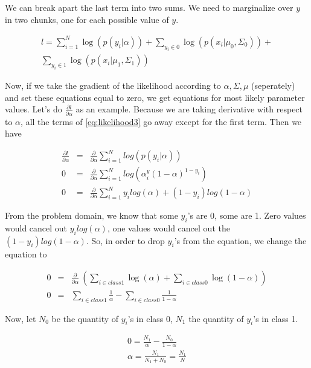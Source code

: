 \documentclass{ecctd01} %
\begin{document}
We can break apart the last term into two sums. We need to marginalize over $y$
in two chunks, one for each possible value of $y$.  

\begin{eqnarray}
  \label{eq:likelihood3}
  l = \sum_{i=1}^N \log(p(y_{i}|\alpha)) + 
  \sum_{y_{i}\in 0} \log(p(x_{i}|\mu_{0},\Sigma_{0})) + \nonumber \\
  \sum_{y_{i}\in 1} \log(p(x_{i}|\mu_{1},\Sigma_{1}))
\end{eqnarray}

Now, if we take the gradient of the likelihood according to $\alpha, \Sigma,
\mu$ (seperately) and set these equations equal to zero, we get equations for
most likely parameter values. Let's do $\frac{\partial l}{\partial
  \alpha}$ as an example. Because we are taking derivative with respect to
$\alpha$, all the terms of \eqref{eq:likelihood3} go away except for
the first term. Then we have

\begin{eqnarray}
  \label{eq:likelihood4}
  \frac{\partial l}{\partial \alpha} &=&
  \frac{\partial }{\partial \alpha}
  \sum_{i=1}^N log (p(y_{i}|\alpha))  \nonumber \\
  0 &=&
  \frac{\partial}{\partial \alpha}
  \sum_{i=1}^N log\left(\alpha^y_{i}(1-\alpha)^{1-y_{i}}\right) \nonumber \\
  0 &=&
  \frac{\partial}{\partial \alpha}
  \sum_{i=1}^N y_{i}log(\alpha) + (1-y_{i})log(1-\alpha) \nonumber
\end{eqnarray}

From the problem domain, we know that some $y_{i}$'s are 0, some are
1. Zero values would cancel out $y_{i}log(\alpha)$, one values would
cancel out the $(1-y_{i})log(1-\alpha)$. So, in order to drop
$y_{i}$'s from the equation, we change the equation to  

\begin{eqnarray}
  \label{eq:likelihood5}
  0 &=&
  \frac{\partial}{\partial \alpha}\
  \left(
  \sum_{i\in class1} \log(\alpha) +
  \sum_{i\in class0} \log(1-\alpha)
  \right)
  \nonumber \\
  0 &=&
  \sum_{i\in class1}\frac{1}{\alpha} -
  \sum_{i\in class0}\frac{1}{1-\alpha} \nonumber
\end{eqnarray}

Now, let $N_{0}$ be the quantity of $y_{i}$'s in class 0, $N_{1}$ the
quantity of $y_{i}$'s in class 1. 

\begin{eqnarray}
  \label{eq:likelihood6}
  0 = \frac{N_{1}}{\alpha}-\frac{N_{0}}{1-\alpha} \nonumber \\
  \alpha = \frac{N_{1}}{N_{1}+N_{0}} = \frac{N_{1}}{N}\nonumber
\end{eqnarray}
\end{document}
